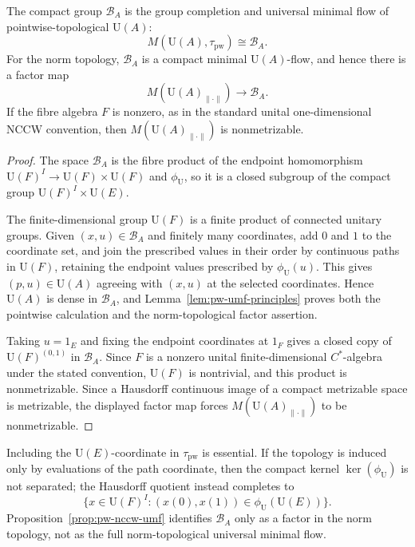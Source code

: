\begin{proposition}\label{prop:pw-nccw-umf}
The compact group \(\mathcal B_A\) is the group completion and universal
minimal flow of pointwise-topological \(\mathrm U(A)\):
\[
M(\mathrm U(A),\tau_{\mathrm{pw}})\cong\mathcal B_A.
\]
For the norm topology, \(\mathcal B_A\) is a compact minimal
\(\mathrm U(A)\)-flow, and hence there is a factor map
\[
M(\mathrm U(A)_{\|\cdot\|})\longrightarrow\mathcal B_A.
\]
If the fibre algebra \(F\) is nonzero, as in the standard unital
one-dimensional NCCW convention, then
\(M(\mathrm U(A)_{\|\cdot\|})\) is nonmetrizable.
\end{proposition}

\begin{proof}
The space \(\mathcal B_A\) is the fibre product of the endpoint homomorphism
\(\mathrm U(F)^I\to\mathrm U(F)\times\mathrm U(F)\) and
\(\phi_{\mathrm U}\), so it is a closed subgroup of the compact group
\(\mathrm U(F)^I\times\mathrm U(E)\).

The finite-dimensional group \(\mathrm U(F)\) is a finite product of connected
unitary groups. Given \((x,u)\in\mathcal B_A\) and finitely many coordinates,
add \(0\) and \(1\) to the coordinate set, and join the prescribed values in
their order by continuous paths in \(\mathrm U(F)\), retaining the endpoint
values prescribed by \(\phi_{\mathrm U}(u)\). This gives
\((p,u)\in\mathrm U(A)\) agreeing with \((x,u)\) at the selected coordinates.
Hence \(\mathrm U(A)\) is dense in \(\mathcal B_A\), and
Lemma~\ref{lem:pw-umf-principles} proves both the pointwise calculation and the
norm-topological factor assertion.

Taking \(u=1_E\) and fixing the endpoint coordinates at \(1_F\) gives a closed
copy of \(\mathrm U(F)^{(0,1)}\) in \(\mathcal B_A\). Since \(F\) is a
nonzero unital finite-dimensional \(C^*\)-algebra under the stated
convention, \(\mathrm U(F)\) is
nontrivial, and this product is nonmetrizable. Since a Hausdorff continuous
image of a compact metrizable space is metrizable, the displayed factor map
forces \(M(\mathrm U(A)_{\|\cdot\|})\) to be nonmetrizable.
\end{proof}

\begin{remark}\label{rem:pw-nccw-pointwise-coordinate}
Including the \(\mathrm U(E)\)-coordinate in \(\tau_{\mathrm{pw}}\) is
essential. If the topology is induced only by evaluations of the path
coordinate, then the compact kernel \(\ker(\phi_{\mathrm U})\) is not
separated; the Hausdorff quotient instead completes to
\[
\{x\in\mathrm U(F)^I:
  (x(0),x(1))\in\phi_{\mathrm U}(\mathrm U(E))\}.
\]
Proposition~\ref{prop:pw-nccw-umf} identifies \(\mathcal B_A\) only as a
factor in the norm topology, not as the full norm-topological universal
minimal flow.
\end{remark}



